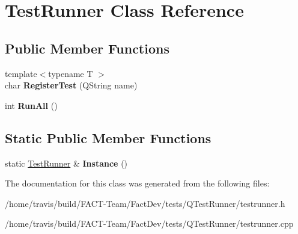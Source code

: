 \hypertarget{classTestRunner}{\section{Test\-Runner Class Reference}
\label{classTestRunner}
}
\subsection*{Public Member Functions}
\begin{DoxyCompactItemize}
\item 
\hypertarget{classTestRunner_affb5703febccf285914b08ce39e7396f}{{\footnotesize template$<$typename T $>$ }\\char {\bfseries Register\-Test} (Q\-String name)}\label{classTestRunner_affb5703febccf285914b08ce39e7396f}

\item 
\hypertarget{classTestRunner_a10db57abd545dd4f9b93e7aeaae55e4c}{int {\bfseries Run\-All} ()}\label{classTestRunner_a10db57abd545dd4f9b93e7aeaae55e4c}

\end{DoxyCompactItemize}
\subsection*{Static Public Member Functions}
\begin{DoxyCompactItemize}
\item 
\hypertarget{classTestRunner_a4707c4680c85ce622fc375efcf39fc25}{static \hyperlink{classTestRunner}{Test\-Runner} \& {\bfseries Instance} ()}\label{classTestRunner_a4707c4680c85ce622fc375efcf39fc25}

\end{DoxyCompactItemize}


The documentation for this class was generated from the following files\-:\begin{DoxyCompactItemize}
\item 
/home/travis/build/\-F\-A\-C\-T-\/\-Team/\-Fact\-Dev/tests/\-Q\-Test\-Runner/testrunner.\-h\item 
/home/travis/build/\-F\-A\-C\-T-\/\-Team/\-Fact\-Dev/tests/\-Q\-Test\-Runner/testrunner.\-cpp\end{DoxyCompactItemize}
